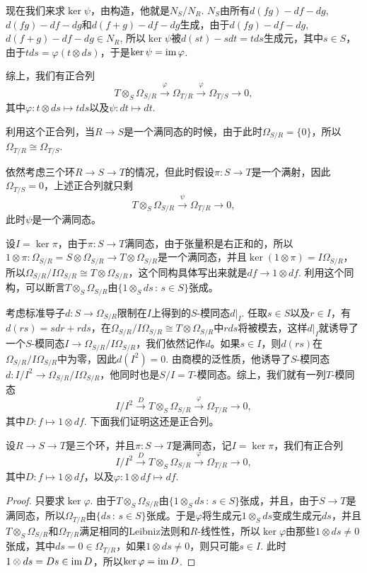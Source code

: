 现在我们来求$\ker\psi$，由构造，他就是$N_S/N_R$. $N_S$由所有$d(fg)-df-dg$, $d(fg)-df-dg$和$d(f+g)-df-dg$生成，由于$d(fg)-df-dg$, $d(f+g)-df-dg\in N_R$, 所以$\ker\psi$被$d(st)-sdt=tds$生成元，其中$s\in S$，由于$tds=\varphi(t\otimes ds)$，于是$\ker\psi=\operatorname{im}\varphi$.

综上，我们有正合列
\[
	T\otimes_S \Omega_{S/R}\xrightarrow{\varphi} \Omega_{T/R}\xrightarrow{\varphi} \Omega_{T/S}\to 0,
\]
其中$\varphi:t\otimes ds\mapsto tds$以及$\psi:dt\mapsto dt$.

利用这个正合列，当$R\to S$是一个满同态的时候，由于此时$\Omega_{S/R}=\{0\}$，所以$\Omega_{T/R}\cong \Omega_{T/S}$.

\para 依然考虑三个环$R\to S\to T$的情况，但此时假设$\pi:S\to T$是一个满射，因此$\Omega_{T/S}=0$，上述正合列就只剩
\[
	T\otimes_S \Omega_{S/R}\xrightarrow{\psi} \Omega_{T/R}\to 0,
\]
此时$\psi$是一个满同态。

设$I=\ker \pi$，由于$\pi:S\to T$满同态，由于张量积是右正和的，所以$1\otimes \pi:\Omega_{S/R}=S\otimes\Omega_{S/R}\to T\otimes\Omega_{S/R}$是一个满同态，并且$\ker(1\otimes \pi)=I\Omega_{S/R}$，所以$\Omega_{S/R}/I\Omega_{S/R}\cong T\otimes\Omega_{S/R}$，这个同构具体写出来就是$df\to 1\otimes df$. 利用这个同构，可以断言$T\otimes_S\Omega_{S/R}$由$\{1\otimes_S ds\,:\,s\in S\}$张成。

考虑标准导子$d:S\to \Omega_{S/R}$限制在$I$上得到的$S$-模同态$d|_I$. 任取$s\in S$以及$r\in I$，有$d(rs)=sdr+rds$，在$\Omega_{S/R}/I\Omega_{S/R}\cong T\otimes\Omega_{S/R}$中$rds$将被模去，这样$d|_I$就诱导了一个$S$-模同态$I\to \Omega_{S/R}/I\Omega_{S/R}$，我们依然记作$d$。如果$s\in I$，则$d(rs)$在$\Omega_{S/R}/I\Omega_{S/R}$中为零，因此$d(I^2)=0$. 由商模的泛性质，他诱导了$S$-模同态$d:I/I^2\to \Omega_{S/R}/I\Omega_{S/R}$，他同时也是$S/I=T$-模同态。综上，我们就有一列$T$-模同态
\[
	I/I^2\xrightarrow{D} T\otimes_S\Omega_{S/R}\xrightarrow{\varphi} \Omega_{T/R}\to 0,
\]
其中$D:f\mapsto 1\otimes df$. 下面我们证明这还是正合列。

\begin{pro}
设$R\to S\to T$是三个环，并且$\pi:S\to T$是满同态，记$I=\ker\pi$，我们有正合列
\[
	I/I^2\xrightarrow{D} T\otimes_S\Omega_{S/R}\xrightarrow{\varphi} \Omega_{T/R}\to 0,
\]
其中$D:f\mapsto 1\otimes df$，以及$\varphi:1\otimes df\mapsto df$.
\end{pro}

\begin{proof}
只要求$\ker \varphi$. 由于$T\otimes_S\Omega_{S/R}$由$\{1\otimes_S ds\,:\,s\in S\}$张成，并且，由于$S\to T$是满同态，所以$\Omega_{T/R}$由$\{ds\,:\,s\in S\}$张成。于是$\varphi$将生成元$1\otimes_S ds$变成生成元$ds$，并且$T\otimes_S\Omega_{S/R}$和$\Omega_{T/R}$满足相同的Leibniz法则和$R$-线性性，所以$\ker \varphi$由那些$1\otimes ds\neq 0$张成，其中$ds=0\in\Omega_{T/R}$，如果$1\otimes ds\neq 0$，则只可能$s\in I$. 此时$1\otimes ds=Ds\in\operatorname{im} D$，所以$\ker\varphi=\operatorname{im} D$. 
\end{proof}

